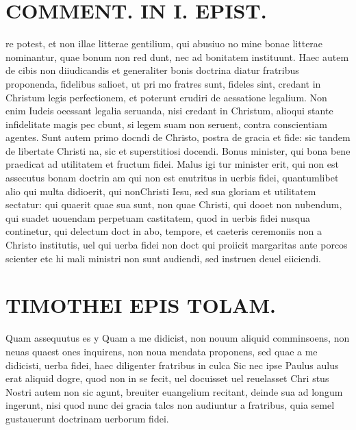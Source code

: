 \documentclass{article}
\begin{document}
\begin{pages}
\section*{COMMENT. IN I. EPIST. }
\marginpar{[ p.102 ]}\pstart re potest, et non illae litterae gentilium, qui abusiuo no mine bonae litterae nominantur, quae bonum non red dunt, nec ad bonitatem instituunt. Haec autem de cibis non diiudicandis et generaliter bonis doctrina diatur fratribus proponenda, fidelibus salioet, ut pri mo fratres sunt, fideles sint, credant in Christum legis perfectionem, et poterunt erudiri de aessatione legalium. Non enim Iudeis oeessant legalia seruanda, nisi credant in Christum, alioqui stante infidelitate magis pec cbunt, si legem suam non seruent, contra conscientiam agentes. Sunt autem primo docndi de Christo, postra de gracia et fide: sic tandem de libertate Christi na, sic et superstitiosi docendi. Bonus minister, qui bona bene praedicat ad utilitatem et fructum fidei. Malus igi tur minister erit, qui non est assecutus bonam doctrin am qui non est enutritus in uerbis fidei, quantumlibet alio qui multa didioerit, qui nonChristi Iesu, sed sua gloriam et utilitatem sectatur: qui quaerit quae sua sunt, non quae Christi, qui dooet non nubendum, qui suadet uouendam perpetuam castitatem, quod in uerbis fidei nusqua continetur, qui delectum doct in abo, tempore, et caeteris ceremoniis non a Christo institutis, uel qui uerba fidei non doct qui proiicit margaritas ante porcos scienter etc hi mali ministri non sunt audiendi, sed instruen deuel eiiciendi.  \pend
\section*{TIMOTHEI EPIS TOLAM. }
\marginpar{[ p.103 ]}\pstart Quam assequutus es y Quam a me didicist, non nouum aliquid comminsoens, non neuas quaest ones inquirens, non noua mendata proponens, sed quae a me didicisti, uerba fidei, haec diligenter fratribus in culca Sic nec ipse Paulus aulus erat aliquid dogre, quod non in se fecit, uel docuisset uel reuelasset Chri stus Nostri autem non sic agunt, breuiter euangelium recitant, deinde sua ad longum ingerunt, nisi quod nunc dei gracia talcs non audiuntur a fratribus, quia semel gustauerunt doctrinam uerborum fidei.  \pend
{}
{}

\end{pages}
\end{document}
